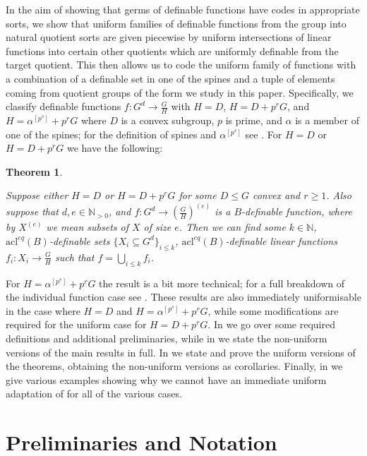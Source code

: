 \documentclass[a4paper,11pt]{article}
\newtheorem{theorem}{Theorem}[section]
\newcommand{\acl}{\textrm{acl}}
\newcommand{\nl}{\newline}
\begin{document}
In the aim of showing that germs of definable functions have codes in appropriate sorts, we show that uniform families of definable functions from the group into natural quotient sorts are given piecewise by uniform intersections of linear functions into certain other quotients which are uniformly definable from the target quotient. This then allows us to code the uniform family of functions with a combination of a definable set in one of the spines and a tuple of elements coming from quotient groups of the form we study in this paper.
\nl\nl
Specifically, we classify definable functions $f:G^d\rightarrow \frac{G}{H}$ with $H = D$, $H=D+p^rG$, and $H=\alpha^{[p^s]}+p^rG$ where $D$ is a convex subgroup, $p$ is prime, and $\alpha$ is a member of one of the spines; for the definition of spines and $\alpha^{[p^s]}$ see . For $H=D$ or $H=D+p^rG$ we have the following:

\begin{theorem}\label{introTheorem}
	
	Suppose either $H = D$ or $H= D+p^rG$ for some $D\leq G$ convex and $r\geq 1$. Also suppose that $d,e\in\mathbb{N}_{>0}$, and $f:G^d\rightarrow (\frac{G}{H})^{(e)}$ is a $B$-definable function, where by $X^{(e)}$ we mean subsets of $X$ of size $e$. Then we can find some $k\in \mathbb{N}$, $\acl^{eq}(B)$-definable sets $\{X_i\subseteq G^d\}_{i\leq k}$, $\acl^{eq}(B)$-definable linear functions $f_i:X_i\rightarrow \frac{G}{H}$ such that $f = \bigcup\limits_{i\leq k}f_i$.
\end{theorem}
\noindent For $H=\alpha^{[p^s]}+p^rG$ the result is a bit more technical; for a full breakdown of the individual function case see . These results are also immediately uniformisable in the case where $H=D$ and $H=\alpha^{[p^s]}+p^rG$, while some modifications are required for the uniform case for $H=D+p^rG$.
\nl\nl
In  we go over some required definitions and additional preliminaries, while in  we state the non-uniform versions of the main results in full. In  we state and prove the uniform versions of the theorems, obtaining the non-uniform versions as corollaries. Finally, in  we give various examples showing why we cannot have an immediate uniform adaptation of  for all of the various cases.

\section{Preliminaries and Notation}\label{prelims}
\end{document}
